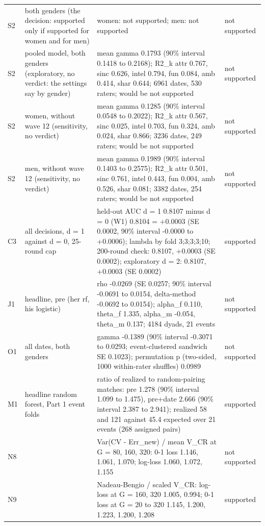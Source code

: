 \documentclass[11pt]{article}
\begin{document}
\begin{longtable}{lL{2.6cm}L{9.6cm}l}
S2 & both genders (the decision: supported only if supported for women and for men) & women: not supported; men: not supported & not supported \\
S2 & pooled model, both genders (exploratory, no verdict: the settings say by gender) & mean gamma 0.1793 (90\% interval 0.1418 to 0.2168); R2\_k attr 0.767, sinc 0.626, intel 0.794, fun 0.084, amb 0.414, shar 0.644; 6961 dates, 530 raters; would be not supported & not supported \\
S2 & women, without wave 12 (sensitivity, no verdict) & mean gamma 0.1285 (90\% interval 0.0548 to 0.2022); R2\_k attr 0.567, sinc 0.025, intel 0.703, fun 0.324, amb 0.024, shar 0.866; 3236 dates, 249 raters; would be not supported & not supported \\
S2 & men, without wave 12 (sensitivity, no verdict) & mean gamma 0.1989 (90\% interval 0.1403 to 0.2575); R2\_k attr 0.501, sinc 0.761, intel 0.443, fun 0.004, amb 0.526, shar 0.081; 3382 dates, 254 raters; would be not supported & not supported \\
C3 & all decisions, d = 1 against d = 0, 25-round cap & held-out AUC d = 1 0.8107 minus d = 0 (W1) 0.8104 = +0.0003 (SE 0.0002, 90\% interval -0.0000 to +0.0006); lambda by fold 3;3;3;3;10; 200-round check: 0.8107, +0.0003 (SE 0.0002); exploratory d = 2: 0.8107, +0.0003 (SE 0.0002) & supported \\
J1 & headline, pre (her rf, his logistic) & rho -0.0269 (SE 0.0257; 90\% interval -0.0691 to 0.0154, delta-method -0.0692 to 0.0154); alpha\_f 0.110, theta\_f 1.335, alpha\_m -0.054, theta\_m 0.137; 4184 dyads, 21 events & not supported \\
O1 & all dates, both genders & gamma -0.1389 (90\% interval -0.3071 to 0.0293; event-clustered sandwich SE 0.1023); permutation p (two-sided, 1000 within-rater shuffles) 0.0989 & not supported \\
M1 & headline random forest, Part 1 event folds & ratio of realized to random-pairing matches: pre 1.278 (90\% interval 1.099 to 1.475), pre+date 2.666 (90\% interval 2.387 to 2.941); realized 58 and 121 against 45.4 expected over 21 events (268 assigned pairs) & supported \\
N8 &  & Var(CV - Err\_new) / mean V\_CR at G = 80, 160, 320: 0-1 loss 1.146, 1.061, 1.070; log-loss 1.060, 1.072, 1.155 & not supported \\
N9 &  & Nadeau-Bengio / scaled V\_CR: log-loss at G = 160, 320 1.005, 0.994; 0-1 loss at G = 20 to 320 1.145, 1.200, 1.223, 1.200, 1.208 & supported \\

\end{longtable}
\end{document}
